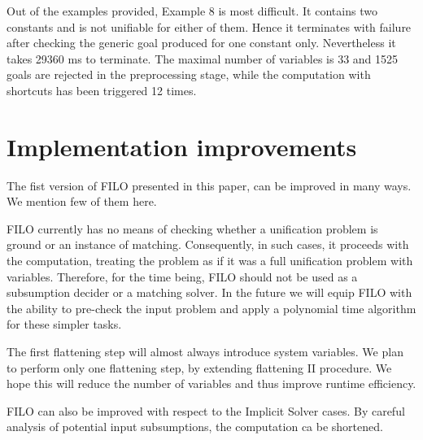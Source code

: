 \documentclass{article}
\begin{document}
	
	Out of the examples provided, Example 8 is most difficult.
	It contains two constants and is not unifiable for either of them. Hence it terminates 
	with failure after checking the generic goal produced for one constant only.
	Nevertheless it takes 29360 ms to terminate. The maximal number of variables is 33 and 1525 goals are
	rejected in the preprocessing stage, while the computation with shortcuts has been triggered 12 times.
	
	\section{Implementation improvements}
	
	The fist version of FILO presented in this paper, can be improved in many ways. We mention few of them here.

	FILO currently has no means of checking whether a unification problem is ground or an instance of matching. Consequently, in such cases, it proceeds with the computation, treating the problem as if it was a full unification problem with variables. 
	Therefore, for the time being, FILO should not be used as a subsumption decider or a matching solver. 
	In the future we will equip FILO with the ability to pre-check the input problem and apply a polynomial time algorithm for these simpler tasks.
	
	The first flattening step will almost always introduce system variables. We plan to 
	perform only one flattening step, by extending flattening II procedure. We hope this will reduce the number
	of variables and thus improve runtime efficiency.
	
	FILO can also be improved with respect to the Implicit Solver cases. By careful analysis of potential input subsumptions, the computation ca be shortened. 
	
\end{document}
